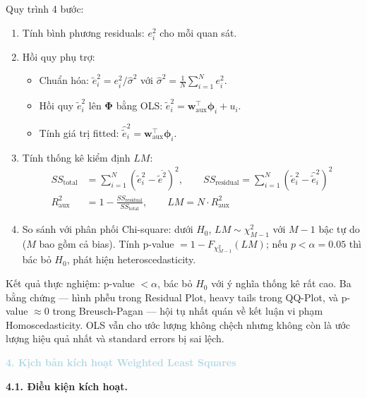 Quy trình 4 bước:
\begin{enumerate}
    \item Tính bình phương residuals: $e_i^2$ cho mỗi quan sát.

    \item Hồi quy phụ trợ:
    \begin{itemize}
        \item Chuẩn hóa: $\tilde{e}_i^2 = e_i^2 / \hat{\sigma}^2$ với $\hat{\sigma}^2 = \frac{1}{N}\sum_{i=1}^{N} e_i^2$.
        \item Hồi quy $\tilde{e}_i^2$ lên $\boldsymbol{\Phi}$ bằng OLS: $\tilde{e}_i^2 = \mathbf{w}_{\text{aux}}^{\top} \boldsymbol{\phi}_i + u_i$.
        \item Tính giá trị fitted: $\hat{\tilde{e}}_i^2 = \mathbf{w}_{\text{aux}}^{\top} \boldsymbol{\phi}_i$.
    \end{itemize}

    \item Tính thống kê kiểm định $LM$:
    \begin{align*}
        SS_{\text{total}}    &= \sum_{i=1}^{N} (\tilde{e}_i^2 - \overline{\tilde{e}^2})^2, \qquad
        SS_{\text{residual}} = \sum_{i=1}^{N} (\tilde{e}_i^2 - \hat{\tilde{e}}_i^2)^2 \\
        R^2_{\text{aux}}     &= 1 - \frac{SS_{\text{residual}}}{SS_{\text{total}}}, \qquad
        LM = N \cdot R^2_{\text{aux}}
    \end{align*}

    \item So sánh với phân phối Chi-square: dưới $H_0$, $LM \sim \chi^2_{M-1}$ với $M-1$ bậc tự do ($M$ bao gồm cả bias). Tính p-value $= 1 - F_{\chi^2_{M-1}}(LM)$; nếu $p < \alpha = 0.05$ thì bác bỏ $H_0$, phát hiện heteroscedasticity.
\end{enumerate}

Kết quả thực nghiệm: p-value $< \alpha$, bác bỏ $H_0$ với ý nghĩa thống kê rất cao. Ba bằng chứng --- hình phễu trong Residual Plot, heavy tails trong QQ-Plot, và p-value $\approx 0$ trong Breusch-Pagan --- hội tụ nhất quán về kết luận vi phạm Homoscedasticity. OLS vẫn cho ước lượng không chệch nhưng không còn là ước lượng hiệu quả nhất và standard errors bị sai lệch. 

\vspace{0.5em}
\noindent\textcolor{lightblue}{\textbf{4. Kịch bản kích hoạt Weighted Least Squares}}
\vspace{0.5em}

\textbf{4.1. Điều kiện kích hoạt.}

